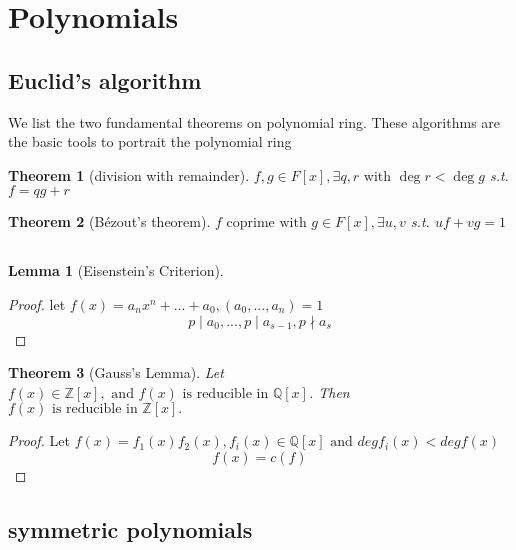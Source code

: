 \documentclass{book}
\newtheorem{theorem}{Theorem}[section]
\newtheorem{lemma}{Lemma}[section]
\theoremstyle{definition}
\begin{document}
\section{Polynomials}
\subsection{Euclid's algorithm}
We list the two fundamental theorems on polynomial ring. These algorithms are the basic tools to portrait the polynomial ring
\begin{theorem}[division with remainder]
$f,g\in F[x],\exists q,r\text{ with } \deg r<\deg g$ s.t. $f=qg+r$
\end{theorem}
\begin{theorem}[Bézout's theorem]
$f\text{ coprime with }g\in F[x],\exists u,v$ s.t. $uf+vg=1$
\end{theorem}


\subsection{}
\begin{lemma}[Eisenstein's Criterion]
\end{lemma}
\begin{proof}
let $f(x)=a_nx^n+...+a_0,(a_0,...,a_n)=1$
\[p\mid a_0,...,p\mid a_{s-1},p\nmid a_s\]

\end{proof}

\begin{theorem}[Gauss's Lemma]
 Let $f(x)\in \mathbb{Z}[x],\text{ and }f(x)\text{ is reducible in }\mathbb{Q}[x]$. Then $f(x) \text{ is reducible in }\mathbb{Z}[x].$
\end{theorem}
\begin{proof} Let $f(x)=f_1(x)f_2(x), f_i(x)\in \mathbb{Q}[x] \text{ and } degf_i(x)<degf(x)$
\[f(x)=c(f)\]
\end{proof}

\subsection{symmetric polynomials}
\end{document}
